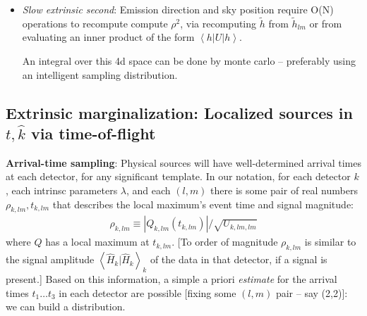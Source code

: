 \documentclass[twocolumn,prd,nofootinbib]{revtex4}
\newcommand\qmstateproduct[2]{\left\langle#1|#2\right\rangle}
\newcommand\qmoperatorelement[3]{\left\langle#1\left|#2\right|#3\right\rangle}
\begin{document}
\begin{widetext}
{\begin{itemize}
\begin{shaded}
    Given these two terms, we compute an ``easy'' integral,
where every term in the integrand can be computed from a quick interpolation over a well-sampled, low-dimensional function:
\begin{eqnarray}
L_{red,EZ} \equiv \int \frac{dt}{T_{\rm window}} \frac{d\psi}{\pi} \frac{dr}{r_{\rm max}^3/3}e^{\ln  L}
\end{eqnarray}
\end{shaded}

\item \emph{Slow extrinsic second}: Emission direction and sky position require O(N) operations to recompute compute
  $\rho^2$, via recomputing $\tilde{h}$ from $\tilde{h}_{lm}$ or from evaluating an inner product of the form
  $\qmoperatorelement{h}{U}{h}$.    

An integral over this 4d space can be done by monte carlo -- preferably using an intelligent sampling distribution.

\end{itemize}
}




\subsection{Extrinsic marginalization: Localized sources in $t,\hat{k}$ via time-of-flight }
\label{sec:sub:MarginalizeViaTimeOfFlight}

\noindent \textbf{Arrival-time sampling}: Physical sources will have well-determined arrival times at each detector,
for any significant template.  In our notation, for each detector $k$, each intrinsc parameters $\lambda$, and each
$(l,m)$ there is some pair of real numbers $\rho_{k,lm},t_{k,lm}$  that describes the local maximum's event time and
signal magnitude:
\begin{eqnarray}
\rho_{k,lm} \equiv |Q_{k,lm}(t_{k,lm})|/\sqrt{U_{k,lm,lm}}
\end{eqnarray}
where $Q$ has a local maximum at $t_{k,lm}$.  
[To order of magnitude $\rho_{k,lm}$ is similar to the signal amplitude $\qmstateproduct{\hat{H}_k}{\hat{H}_k}_k$ of the
data in that detector, if a signal is present.]
%
Based on this information, a simple a priori \emph{estimate} for the arrival times $t_1\ldots t_3$ in each detector are possible
[fixing some $(l,m)$ pair -- say (2,2)]: we can build a distribution.


\end{widetext}
\end{document}
